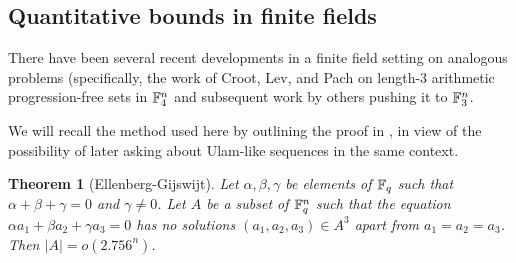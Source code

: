 \documentclass{article}
\newtheorem{theorem}{Theorem}[section]
\theoremstyle{definition}
\theoremstyle{remark}
\numberwithin{equation}{section}
\begin{document}
  


\subsection{Quantitative bounds in finite fields}

There have been several recent developments in a finite field setting
on analogous problems (specifically, the work of Croot, Lev, and Pach
\cite{croot:preprint} on length-3 arithmetic progression-free sets
in $\mathbb{F}_4^n$ and subsequent work by others \cite{ellenberg:preprint}
pushing it to $\mathbb{F}_3^n$.

We will recall the method used here by outlining the proof in
\cite{ellenberg:preprint}, in view of the possibility of later asking
about Ulam-like sequences in the same context.

\begin{theorem}[Ellenberg-Gijswijt]
Let $\alpha, \beta, \gamma$ be elements of $\mathbb{F}_q$ such that
$\alpha+\beta+\gamma = 0$ and $\gamma \neq 0$.  Let $A$ be a subset of
$\mathbb{F}_q^n$ such that the equation $\alpha a_1 + \beta a_2 + \gamma a_3
= 0$ has no solutions $(a_1, a_2, a_3) \in A^3$ apart from $a_1 = a_2
= a_3$.  Then $|A| = o(2.756^n)$.
\end{theorem}
\end{document}

